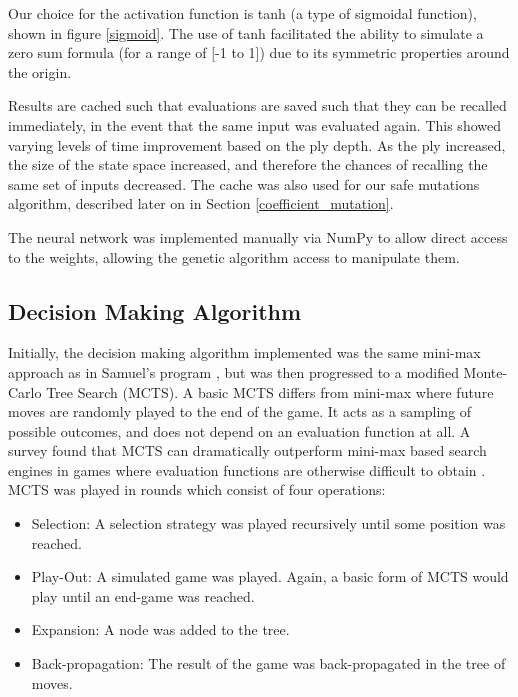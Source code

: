 \documentclass[12pt,a4paper]{article}
\begin{document}
        Our choice for the activation function is tanh (a type of sigmoidal function), shown in figure \ref{sigmoid}. 
        The use of tanh facilitated the ability to simulate a zero sum formula (for a range of [-1 to 1]) due to its symmetric properties around the origin.
        
        Results are cached such that evaluations are saved such that they can be recalled immediately, in the event that the same input was evaluated again. This showed  varying levels of time improvement based on the ply depth. As the ply increased, the size of the state space increased, and therefore the chances of recalling the same set of inputs decreased. The cache was also used for our safe mutations algorithm, described later on in Section \ref{coefficient_mutation}.

        The neural network was implemented manually via NumPy to allow direct access to the weights, allowing the genetic algorithm access to manipulate them.
    
    \subsection{Decision Making Algorithm}
        Initially, the decision making algorithm implemented was the same mini-max approach as in Samuel's program \cite{samuel_studies_1959}, but was then progressed to a modified Monte-Carlo Tree Search (MCTS). A basic MCTS differs from mini-max where future moves are randomly played to the end of the game. It acts as a sampling of possible outcomes, and does not depend on an evaluation function at all. A survey found that MCTS can dramatically outperform mini-max based search engines in games where evaluation functions are otherwise difficult to obtain \cite{browne_survey_2012}. MCTS was played in rounds which consist of four operations:

        \begin{itemize}
            \item Selection: A selection strategy was played recursively until some position was reached. 
            \item Play-Out: A simulated game was played. Again, a basic form of MCTS would play until an end-game was reached.
            \item Expansion: A node was added to the tree.
            \item Back-propagation: The result of the game was back-propagated in the tree of moves.
        \end{itemize}
\end{document}
